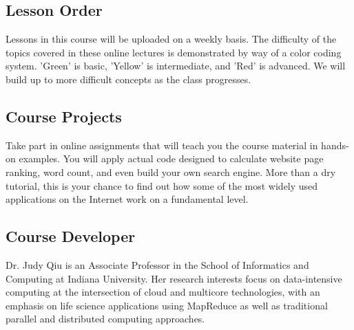 \subsection{Lesson Order}
Lessons in this course will be uploaded on a weekly basis. The difficulty of
the topics covered in these online lectures is demonstrated by way of a color
coding system. 'Green' is basic, 'Yellow' is intermediate, and 'Red' is
advanced. We will build up to more difficult concepts as the class progresses.

\subsection{Course Projects}
Take part in online assignments that will teach you the course material in
hands-on examples. You will apply actual code designed to calculate website
page ranking, word count, and even build your own search engine. More than a
dry tutorial, this is your chance to find out how some of the most widely used
applications on the Internet work on a fundamental level.

\subsection{Course Developer}
Dr. Judy Qiu is an Associate Professor in the School of Informatics and
Computing at Indiana University. Her research interests focus on data-intensive
computing at the intersection of cloud and multicore technologies, with an
emphasis on life science applications using MapReduce as well as traditional
parallel and distributed computing approaches.

